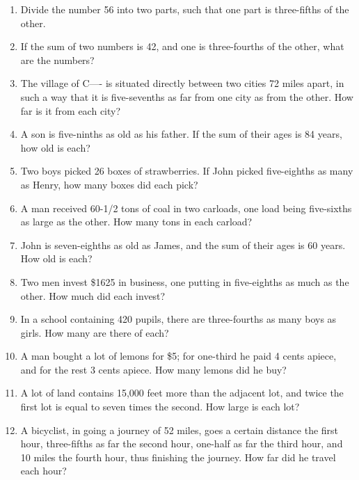 \documentclass{book}
\begin{document}
\begin{enumerate}
\item Divide the number 56 into two parts, such that one part is
three-fifths of the other.

\item If the sum of two numbers is 42, and one is three-fourths of
the other, what are the numbers?

\item The village of C---- is situated directly between two cities
72 miles apart, in such a way that it is five-sevenths as far from
one city as from the other. How far is it from each city?

\item A son is five-ninths as old as his father. If the sum of
their ages is 84 years, how old is each?

\item Two boys picked 26 boxes of strawberries. If John picked
five-eighths as many as Henry, how many boxes did each pick?

\item A man received 60-1/2 tons of coal in two carloads, one load
being five-sixths as large as the other. How many tons in each
carload?

\item John is seven-eighths as old as James, and the sum of their
ages is 60 years. How old is each?

\item Two men invest \$1625 in business, one putting in
five-eighths as much as the other. How much did each invest?

\item In a school containing 420 pupils, there are three-fourths
as many boys as girls. How many are there of each?

\item A man bought a lot of lemons for \$5; for one-third he paid
4 cents apiece, and for the rest 3 cents apiece. How many lemons
did he buy?

\item A lot of land contains 15,000 feet more than the adjacent
lot, and twice the first lot is equal to seven times the second.
How large is each lot?

\item A bicyclist, in going a journey of 52 miles, goes a certain
distance the first hour, three-fifths as far the second hour,
one-half as far the third hour, and 10 miles the fourth hour, thus
finishing the journey. How far did he travel each hour?


\end{enumerate}
\end{document}
